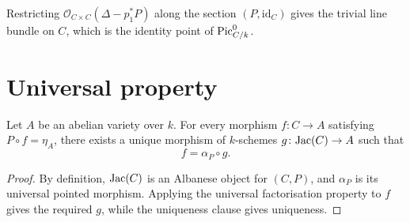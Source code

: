 \begin{remark}
  \label{rem:comp_ofCurve_classical}
  Restricting \(\mathcal O_{C\times C}(\Delta-p_1^*P)\) along the section
  \((P,\mathrm{id}_C)\) gives the trivial line bundle on \(C\), which is the
  identity point of \(\operatorname{Pic}^0_{C/k}\).
\end{remark}

\section{Universal property}

\begin{theorem}\leanok
  \label{thm:exists_unique_ofCurve_comp}
  Let \(A\) be an abelian variety over \(k\).  For every morphism
  \(f \colon C \to A\) satisfying \(P \circ f = \eta_A\), there exists a
  unique morphism of \(k\)-schemes \(g \colon \mathrm{Jac}(C) \to A\) such that
  \[
    f = \alpha_P \circ g.
  \]
\end{theorem}

\begin{proof}
  By definition, \(\mathrm{Jac}(C)\) is an Albanese object for \((C,P)\), and
  \(\alpha_P\) is its universal pointed morphism.  Applying the universal
  factorisation property to \(f\) gives the required \(g\), while the
  uniqueness clause gives uniqueness.
\end{proof}
